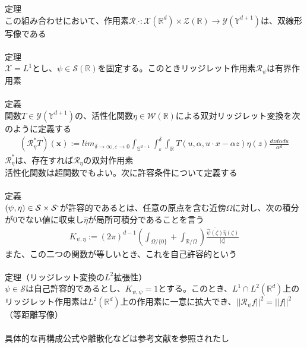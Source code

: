 \documentclass{jsarticle}
\begin{document}
定理\\
この組み合わせにおいて、作用素$\mathcal{R}_\cdot \cdot:\mathcal{X}(\mathbb{R}^d)\times\mathcal{Z}(\mathbb{R})\rightarrow\mathcal{Y}(\mathbb{Y}^{d+1})$は、双線形写像である\\
　\\
定理\\
$\mathcal{X}=L^1$とし、$\psi\in\mathcal{S}(\mathbb{R})$を固定する。このときリッジレット作用素$\mathcal{R}_\psi$は有界作用素\\
　\\
定義\\
関数$T\in\mathcal{Y}(\mathbb{Y}^{d+1})$の、活性化関数$\eta\in\mathcal{W}(\mathbb{R})$による双対リッジレット変換を次のように定義する
\begin{eqnarray}
(\mathcal{R}^*_\eta T)(\bm{x}):=lim_{\delta\rightarrow\infty,\varepsilon\rightarrow0}\int_{\mathbb{S}^{d-1}}\int^\delta_\varepsilon\int_{\mathbb{R}}T(u,\alpha,u\cdot x-\alpha z)\eta(z)\frac{dzd\alpha du}{\alpha^d}
\end{eqnarray}
$\mathcal{R}^*_\eta $は、存在すれば$\mathcal{R}_\eta$の双対作用素
　\\
活性化関数は超関数でもよい。次に許容条件について定義する\\
　\\
定義\\
$(\psi,\eta)\in\mathcal{S}\times \mathcal{S}`$が許容的であるとは、任意の原点を含む近傍$\Omega$に対し、次の積分が0でない値に収束し$\hat{\eta}$が局所可積分であることを言う
\begin{eqnarray}
K_{\psi,\eta}:=(2\pi)^{d-1}(\int_{\Omega/\{0\}}+\int_{\mathbb{R}/\Omega})\frac{\overline{\hat{\psi}(\zeta)}\hat{\eta}(\zeta)}{|\zeta|}
\end{eqnarray}
また、この二つの関数が等しいとき、これを自己許容的という\\
　\\
定理（リッジレット変換の$L^2$拡張性）\\
$\psi\in\mathcal{S}$は自己許容的であるとし、$K_{\psi,\psi}=1$とする。このとき、$L^1\cap L^2(\mathbb{R}^d)$上のリッジレット作用素は$L^2(\mathbb{R}^d)$上の作用素に一意に拡大でき、$||\mathcal{R}_\psi f||^2=||f||^2$（等距離写像）\\
　\\
具体的な再構成公式や離散化などは参考文献を参照されたし
　\\
　\\
　\\



\newpage
\end{document}
